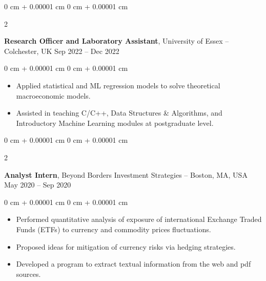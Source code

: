 \documentclass[10pt, letterpaper]{article}
\newenvironment{highlights}{
    \begin{itemize}[
        topsep=0.10 cm,
        parsep=0.10 cm,
        partopsep=0pt,
        itemsep=0pt,
        leftmargin=0 cm + 10pt
    ]
}{
    \end{itemize}
} %
\newenvironment{onecolentry}{
    \begin{adjustwidth}{
        0 cm + 0.00001 cm
    }{
        0 cm + 0.00001 cm
    }
}{
    \end{adjustwidth}
} %
\newenvironment{twocolentry}[2][]{
    \onecolentry
    \def\secondColumn{#2}
    \setcolumnwidth{\fill, 4.5 cm}
    \begin{paracol}{2}
}{
    \switchcolumn \raggedleft \secondColumn
    \end{paracol}
    \endonecolentry
} %
\begin{document}
        \vspace{0.2 cm}

        \begin{twocolentry}{
            Sep 2022 – Dec 2022
        }
            \textbf{Research Officer and Laboratory Assistant}, University of Essex -- Colchester, UK\end{twocolentry}

        \vspace{0.10 cm}
        \begin{onecolentry}
            \begin{highlights}
            \item Applied statistical and ML regression models to solve theoretical macroeconomic models.
                  \item Assisted in teaching C/C++, Data Structures \& Algorithms, and Introductory Machine Learning modules at postgraduate level.
            \end{highlights}
        \end{onecolentry}
    
        \vspace{0.2 cm}

        \begin{twocolentry}{
            May 2020 – Sep 2020
        }
            \textbf{Analyst Intern}, Beyond Borders Investment Strategies -- Boston, MA, USA\end{twocolentry}

            \vspace{0.10 cm}
            \begin{onecolentry}
                \begin{highlights}
                \item Performed quantitative analysis of exposure of international Exchange Traded Funds (ETFs) to currency and commodity prices fluctuations.
                \item Proposed ideas for mitigation of currency risks via hedging strategies.
                \item Developed a program to extract textual information from the web and pdf sources.
                \end{highlights}
            \end{onecolentry}
\end{document}

